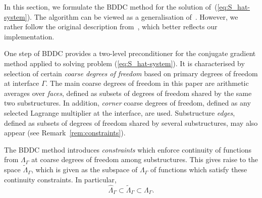 \label{sec:bddc}

In this section, we formulate the BDDC method for the solution
of~(\ref{eq:S_hat-system}). The algorithm can be viewed as a generalisation
of~\cite{Tu-2007-BAF}. However, we rather follow the original description from~\cite{Dohrmann-2003-PSC}, 
which better reflects our implementation. 

One step of BDDC provides a two-level preconditioner for the conjugate gradient method applied to solving problem (\ref{eq:S_hat-system}).
It is characterised by selection of certain \emph{coarse degrees of freedom} based on primary degrees of freedom at interface $\Gamma$. 
The main coarse degrees of freedom in this paper are arithmetic averages over \emph{faces}, 
defined as subsets of degrees of freedom shared by the same two substructures. 
In addition, \emph{corner} coarse degrees of freedom,
defined as any selected Lagrange multiplier at the interface, are used.
Substructure \emph{edges}, defined as subsets of degrees of freedom shared by several substructures, may also appear (see Remark~\ref{rem:constraints}). 

The BDDC method introduces \emph{constraints} which enforce continuity of functions from ${\Lambda}_{\Gamma}$ 
at coarse degrees of freedom among substructures.
This gives raise to the space $\widetilde{\Lambda}_{\Gamma}$, 
which is given as the subspace of ${\Lambda}_{\Gamma}$ of functions 
which satisfy these continuity constraints. 
In particular,
\begin{equation}
\label{eq:subspaces}
\widehat{\Lambda}_{\Gamma} \subset \widetilde{\Lambda}_{\Gamma} \subset {\Lambda}_{\Gamma}.
\end{equation}

